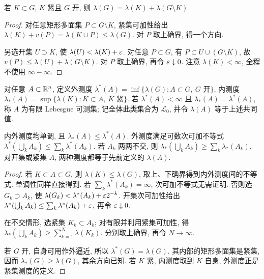 \begin{lemma}\label{ra:c3:compactgap}
若 $K\subset G$, $K$ 紧且 $G$ 开, 则 $\lambda(G)=\lambda(K)+\lambda(G\setminus K)$.
\end{lemma}
\begin{proof}
对任意矩形多面集 $P\subset G\setminus K$, 紧集可加性给出 $\lambda(K)+v(P)=\lambda(K\cup P)\le\lambda(G)$. 对 $P$ 取上确界, 得一个方向.

另选开集 $U\supset K$, 使 $\lambda(U)<\lambda(K)+\varepsilon$. 对任意 $P\subset G$, 有 $P\subset U\cup(G\setminus K)$, 故 $v(P)\le\lambda(U)+\lambda(G\setminus K)$. 对 $P$ 取上确界, 再令 $\varepsilon\downarrow0$. 注意 $\lambda(K)<\infty$, 全程不使用 $\infty-\infty$.
\end{proof}


\begin{definition}\label{ra:c3:innerouter}
对任意 $A\subset\mathbb R^n$, 定义外测度 $\lambda^*(A)=\inf\{\lambda(G):A\subset G,\ G\text{ 开}\}$, 内测度 $\lambda_*(A)=\sup\{\lambda(K):K\subset A,\ K\text{ 紧}\}$. 若 $\lambda^*(A)<\infty$ 且 $\lambda_*(A)=\lambda^*(A)$, 称 $A$ 为有限 Lebesgue 可测集; 记全体此类集合为 $\mathcal L_0$, 并令 $\lambda(A)$ 等于上述共同值.
\end{definition}

\begin{proposition}\label{ra:c3:outerproperties}
内外测度均单调, 且 $\lambda_*(A)\le\lambda^*(A)$. 外测度满足可数次可加不等式 $\lambda^*(\bigcup_kA_k)\le\sum_k\lambda^*(A_k)$. 若 $A_k$ 两两不交, 则 $\lambda_*(\bigcup_kA_k)\ge\sum_k\lambda_*(A_k)$. 对开集或紧集 $A$, 两种测度都等于先前定义的 $\lambda(A)$.
\end{proposition}
\begin{proof}
若 $K\subset A\subset G$, 则 $\lambda(K)\le\lambda(G)$, 取上、下确界得到内外测度间的不等式. 单调性同样直接得到. 若 $\sum_k\lambda^*(A_k)=\infty$, 次可加不等式无需证明. 否则选 $G_k\supset A_k$, 使 $\lambda(G_k)<\lambda^*(A_k)+\varepsilon2^{-k}$. 开集次可加性给出 $\lambda^*(\bigcup_kA_k)\le\sum_k\lambda^*(A_k)+\varepsilon$, 再令 $\varepsilon\downarrow0$.

在不交情形, 选紧集 $K_k\subset A_k$; 对有限并利用紧集可加性, 得 $\lambda_*(\bigcup_kA_k)\ge\sum_{k=1}^N\lambda(K_k)$. 分别取上确界, 再令 $N\to\infty$.

若 $G$ 开, 自身可用作外逼近, 所以 $\lambda^*(G)=\lambda(G)$. 其内部的矩形多面集是紧集, 因而 $\lambda_*(G)\ge\lambda(G)$, 其余方向已知. 若 $K$ 紧, 内测度取到 $K$ 自身, 外测度正是紧集测度的定义.
\end{proof}

